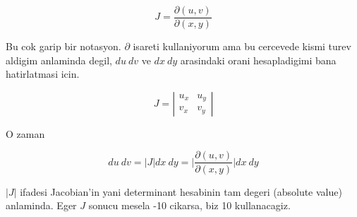 \documentclass[12pt,fleqn]{article}
\begin{document}
\[ J = \frac{\partial (u,v)}{\partial(x,y)} \]

Bu cok garip bir notasyon. $\partial$ isareti kullaniyorum ama bu cercevede
kismi turev aldigim anlaminda degil, $du \ dv$ ve $dx \ dy$ arasindaki
orani hesapladigimi bana hatirlatmasi icin. 

\[ J =  \left|\begin{array}{rr}
u_x & u_y \\
v_x & v_y
\end{array}\right|
\]

O zaman 

\[ du \ dv = 
|J| dx \ dy = 
\bigg|\frac{\partial (u,v)}{\partial(x,y)}\bigg| dx \ dy
 \]

$|J|$ ifadesi Jacobian'in yani determinant hesabinin tam degeri (absolute
value) anlaminda. Eger $J$ sonucu mesela -10 cikarsa, biz 10 kullanacagiz. 
\end{document}
